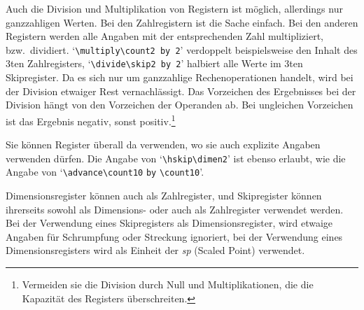 Auch die 
Division und 
Multiplikation von Registern ist m\"oglich,
allerdings nur ganzzahligen Werten. Bei den Zahlregistern ist die
Sache einfach. Bei den anderen Registern werden alle Angaben mit der
entsprechenden Zahl multipliziert, bzw.\ dividiert.
`\verb|\multiply\count2 by 2|' 
verdoppelt beispielsweise den Inhalt
des 3ten Zahlregisters, 
`\verb|\divide\skip2 by 2|' halbiert alle
Werte im 3ten Skipregister. Da es sich nur um ganzzahlige
Rechenoperationen handelt, wird bei der Division etwaiger Rest
vernachl\"assigt. Das Vorzeichen des Ergebnisses bei der Division h\"angt
von den Vorzeichen der Operanden ab. Bei ungleichen Vorzeichen ist das
Ergebnis negativ, sonst positiv.\footnote{Vermeiden sie die Division
durch Null und 
Multiplikationen, die die Kapazit\"at des Registers
\"uberschreiten.}

Sie k\"onnen Register \"uberall da verwenden, wo sie auch explizite
Angaben verwenden d\"urfen. Die Angabe von 
`\verb|\hskip\dimen2|' ist
ebenso erlaubt, wie die Angabe von 
`\verb|\advance\count10|
\verb|by| \verb|\count10|'.

Dimensionsregister k\"onnen auch als Zahlregister, und Skipregister
k\"onnen ihrerseits sowohl als Dimensions- oder auch als Zahlregister
verwendet werden. Bei der Verwendung eines Skipregisters als
Dimensionsregister, wird etwaige Angaben f\"ur
Schrumpfung oder
Streckung ignoriert, bei der Verwendung eines Dimensionsregisters
wird als Einheit der {\it sp} (Scaled Point) verwendet.

